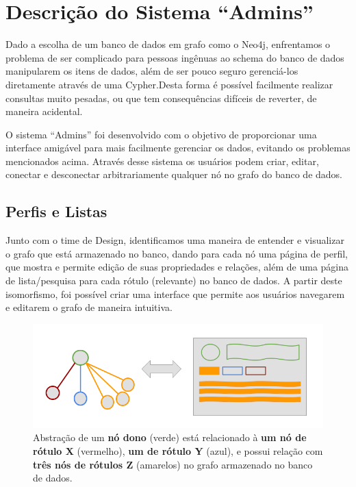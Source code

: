 \chapter{Descrição do Sistema ``Admins''}
\label{chap4}

Dado a escolha de um banco de dados em grafo como o Neo4j, enfrentamos o problema de ser complicado para pessoas ingênuas ao schema do banco de dados manipularem os itens de dados, além de ser pouco seguro gerenciá-los diretamente através de uma Cypher.Desta forma é possível facilmente realizar consultas muito pesadas, ou que tem consequências difíceis de reverter, de maneira acidental.

O sistema ``Admins'' foi desenvolvido com o objetivo de proporcionar uma interface amigável para mais facilmente gerenciar os dados, evitando os problemas mencionados acima. Através desse sistema os usuários podem criar, editar, conectar e desconectar arbitrariamente qualquer nó no grafo do banco de dados.

\section{Perfis e Listas}

Junto com o time de Design, identificamos uma maneira de entender e visualizar o grafo que está armazenado no banco, dando para cada nó uma página de perfil, que mostra e permite edição de suas propriedades e relações, além de uma página de lista/pesquisa para cada rótulo (relevante) no banco de dados. A partir deste isomorfismo, foi possível criar uma interface que permite aos usuários navegarem e editarem o grafo de maneira intuitiva.

\begin{figure}[H]
    \centering
    \includegraphics[width=1.0\linewidth]{Imagens/chap04/perfil-isomorfismo.png}
    \caption{Abstração de um \textbf{nó dono} (verde) está relacionado à \textbf{um nó de rótulo X} (vermelho), \textbf{um de rótulo Y} (azul), e possui relação com \textbf{três nós de rótulos Z} (amarelos) no grafo armazenado no banco de dados.}
    \label{fig:isomorphism}
\end{figure}

